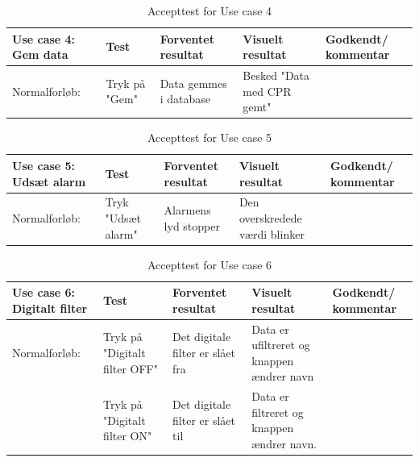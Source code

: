 \begin{table}[H]
\caption{Accepttest for Use case 4}\label{tab:tabel8}
\begin{tabular}{|>{\raggedright\arraybackslash}p{2.5cm}| >{\raggedright\arraybackslash}p{2.9cm} | >{\raggedright\arraybackslash}p{2.9cm} | >{\raggedright\arraybackslash}p{2.9cm} | >{\raggedright\arraybackslash}p{2.8cm} |}
   \hline
   \textbf{Use case 4: Gem data } &\textbf{Test}& \textbf{Forventet resultat} & \textbf{Visuelt resultat} & \textbf{Godkendt/ kommentar}\\ \hline
   Normalforløb:& Tryk på "Gem" & Data gemmes i database & Besked "Data med CPR gemt"&\\\hline
\end{tabular}
\end{table}


\begin{table}[H]
\caption{Accepttest for Use case 5}\label{tab:tabel8}
\begin{tabular}{|>{\raggedright\arraybackslash}p{2.5cm}| >{\raggedright\arraybackslash}p{2.9cm} | >{\raggedright\arraybackslash}p{2.9cm} | >{\raggedright\arraybackslash}p{2.9cm} | >{\raggedright\arraybackslash}p{2.8cm} |}
   \hline
   \textbf{Use case 5: Udsæt alarm } &\textbf{Test}& \textbf{Forventet resultat} & \textbf{Visuelt resultat} & \textbf{Godkendt/ kommentar}\\ \hline
   Normalforløb:& Tryk "Udsæt alarm" & Alarmens lyd stopper & Den overskredede værdi blinker &\\\hline
\end{tabular}
\end{table}



\begin{table}[H]
\caption{Accepttest for Use case 6}\label{tab:tabel8}
\begin{tabular}{|>{\raggedright\arraybackslash}p{2.5cm}| >{\raggedright\arraybackslash}p{2.9cm} | >{\raggedright\arraybackslash}p{2.9cm} | >{\raggedright\arraybackslash}p{2.9cm} | >{\raggedright\arraybackslash}p{2.8cm} |}
   \hline
   \textbf{Use case 6: Digitalt filter } &\textbf{Test}& \textbf{Forventet resultat} & \textbf{Visuelt resultat} & \textbf{Godkendt/ kommentar}\\ \hline
   Normalforløb:& Tryk på "Digitalt filter OFF" & Det digitale filter er slået fra & Data er ufiltreret og knappen ændrer navn &\\\hline
   &Tryk på "Digitalt filter ON" &Det digitale filter er slået til &Data er filtreret og knappen ændrer navn. &\\\hline
\end{tabular}
\end{table}


